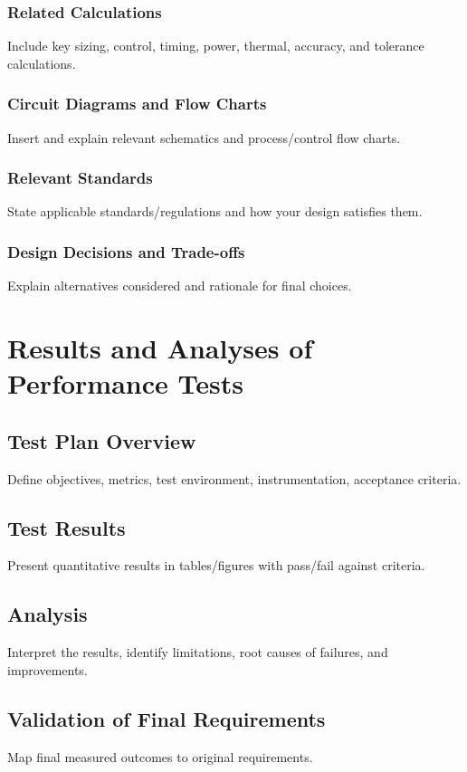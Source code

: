 \documentclass[12pt,a4paper]{report}
\begin{document}
\subsection{Related Calculations}
Include key sizing, control, timing, power, thermal, accuracy, and tolerance calculations.

\subsection{Circuit Diagrams and Flow Charts}
Insert and explain relevant schematics and process/control flow charts.

\subsection{Relevant Standards}
State applicable standards/regulations and how your design satisfies them.

\subsection{Design Decisions and Trade-offs}
Explain alternatives considered and rationale for final choices.

\chapter{Results and Analyses of Performance Tests}

\section{Test Plan Overview}
Define objectives, metrics, test environment, instrumentation, acceptance criteria.

\section{Test Results}
Present quantitative results in tables/figures with pass/fail against criteria.

\section{Analysis}
Interpret the results, identify limitations, root causes of failures, and improvements.

\section{Validation of Final Requirements}
Map final measured outcomes to original requirements.
\end{document}
